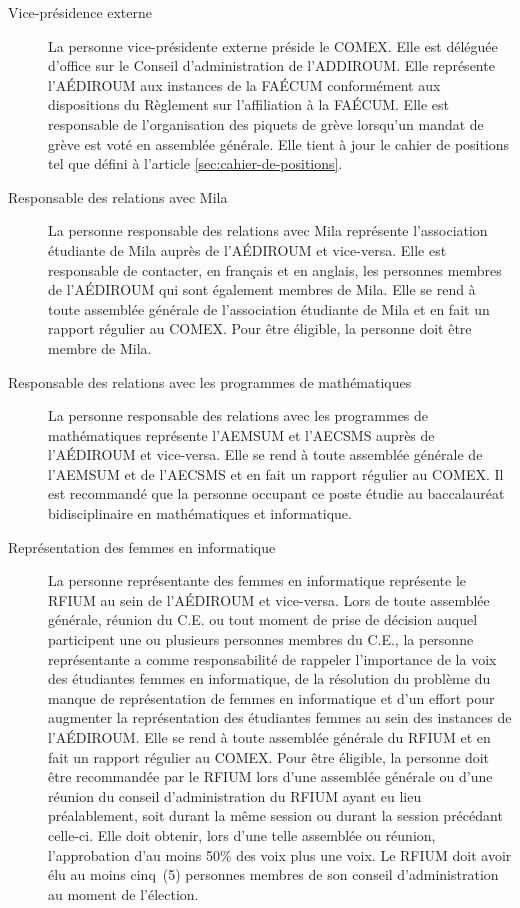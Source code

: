 \documentclass{aediroum}
\newcommand{\article}[1]{article \ref{#1}}
\begin{document}
\begin{description}
    \item[Vice-présidence externe]
        La personne vice-présidente externe préside le COMEX.
        Elle est déléguée d’office sur le Conseil d’administration de l’ADDIROUM.
        Elle représente l’AÉDIROUM aux instances de la FAÉCUM conformément aux dispositions du Règlement sur l’affiliation à la FAÉCUM.
        Elle est responsable de l’organisation des piquets de grève lorsqu’un mandat de grève est voté en assemblée générale.
        Elle tient à jour le cahier de positions tel que défini à l'\article{sec:cahier-de-positions}.

    \item[Responsable des relations avec Mila]
        La personne responsable des relations avec Mila représente l’association étudiante de Mila auprès de l’AÉDIROUM et vice-versa.
        Elle est responsable de contacter, en français et en anglais, les personnes membres de l’AÉDIROUM qui sont également membres de Mila.
        Elle se rend à toute assemblée générale de l’association étudiante de Mila et en fait un rapport régulier au COMEX.
        Pour être éligible, la personne doit être membre de Mila.

    \item[Responsable des relations avec les programmes de mathématiques]
        La personne responsable des relations avec les programmes de mathématiques représente l’AEMSUM et l’AECSMS auprès de l’AÉDIROUM et vice-versa.
        Elle se rend à toute assemblée générale de l’AEMSUM et de l’AECSMS et en fait un rapport régulier au COMEX.
        Il est recommandé que la personne occupant ce poste étudie au baccalauréat bidisciplinaire en mathématiques et informatique.

    \item[Représentation des femmes en informatique]
        La personne représentante des femmes en informatique représente le RFIUM au sein de l’AÉDIROUM et vice-versa.
        Lors de toute assemblée générale, réunion du C.E. ou tout moment de prise de décision auquel participent une ou plusieurs personnes membres du C.E., la personne représentante a comme responsabilité de rappeler l'importance de la voix des étudiantes femmes en informatique, de la résolution du problème du manque de représentation de femmes en informatique et d'un effort pour augmenter la représentation des étudiantes femmes au sein des instances de l'AÉDIROUM.
        Elle se rend à toute assemblée générale du RFIUM et en fait un rapport régulier au COMEX.
        Pour être éligible, la personne doit être recommandée par le RFIUM lors d’une assemblée générale ou d’une réunion du conseil d’administration du RFIUM ayant eu lieu préalablement, soit durant la même session ou durant la session précédant celle-ci.
        Elle doit obtenir, lors d’une telle assemblée ou réunion, l’approbation d’au moins 50\% des voix plus une voix.
        Le RFIUM doit avoir élu au moins cinq~(5) personnes membres de son conseil d’administration au moment de l’élection.


\end{description}
\end{document}
